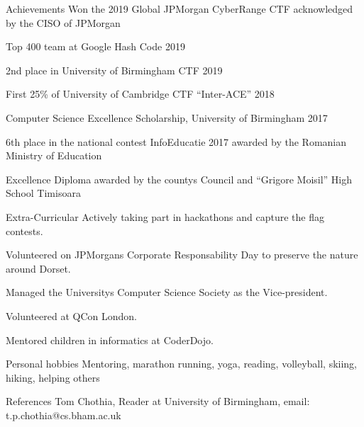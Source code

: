 \documentclass{resume} %
\newcommand{\quotes}[1]{``#1''}
\begin{document}
\begin{rSection}{Achievements} 
Won the 2019 Global JPMorgan CyberRange CTF acknowledged by the CISO of JPMorgan
\item Top 400 team at Google Hash Code 2019 
\item 2nd place in University of Birmingham CTF 2019
\item First 25\% of University of Cambridge CTF \quotes{Inter-ACE} 2018
\item Computer Science Excellence Scholarship, University of Birmingham 2017
\item 6th place in the national contest InfoEducatie 2017 awarded by the Romanian Ministry of Education
\item Excellence Diploma awarded by the county\textsc{}s Council and \quotes{Grigore Moisil} High School Timisoara \\
\end{rSection}


\begin{rSection}{Extra-Curricular} \itemsep -3pt
Actively taking part in hackathons and capture the flag contests.
\item Volunteered on JPMorgan\textsc{}s Corporate Responsability Day to preserve the nature around Dorset.
\item Managed the University\textsc{}s Computer Science Society as the Vice-president.
\item Volunteered at QCon London.
\item Mentored children in informatics at CoderDojo.\\

\end{rSection}

\begin{rSection}{Personal hobbies}
Mentoring, marathon running, yoga, reading, volleyball, skiing, hiking, helping others\\
\end{rSection}

\begin{rSection}{References}
Tom Chothia, Reader at University of Birmingham, email: t.p.chothia@cs.bham.ac.uk
\end{rSection}
\end{document}
